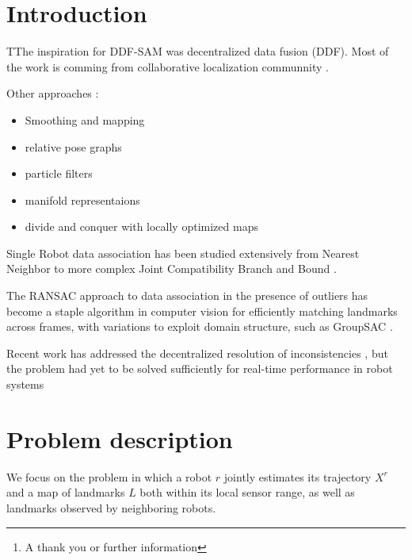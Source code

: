 \documentclass[twoside,twocolumn]{article}
\title{\citetitle{cunningham_fully_2012}} %
\author{%
\textsc{Virgile Daugé}\thanks{A thank you or further information} \\[1ex] %
\normalsize University of Lorraine \\ %
\normalsize \href{mailto:virgile.dauge@inria.fr}{virgile.dauge@inria.fr} %
}
\date{\today} %
\begin{document}
\maketitle


\section{Introduction}

\lettrine[nindent=0em,lines=3]{T}The inspiration for DDF-SAM \cite{cunningham_ddf-sam:_2010} was decentralized data
fusion (DDF). Most of the work is comming from collaborative localization communnity \cite{bailey_decentralised_2011,bahr_consistent_2009}.

Other approaches :
\begin{itemize}
  \item Smoothing and mapping \cite{andersson_c-sam:_2008}
  \item relative pose graphs \cite{kim_multiple_2010}
  \item particle filters \cite{howard_multi-robot_2006,carlone_rao-blackwellized_2010}
  \item manifold representaions \cite{howard_multirobot_2006}
  \item divide and conquer with locally optimized maps \cite{ni_multi-level_2010}
\end{itemize}

Single Robot data association has been studied extensively from
Nearest Neighbor \cite{} to more complex Joint Compatibility Branch
and Bound \cite{neira_data_2001}.

The RANSAC \cite{fischler_random_1981} approach to data association
in the presence of outliers has become a staple algorithm in
computer vision for efficiently matching landmarks across frames, with variations to exploit
domain  structure,  such  as  GroupSAC  \cite{ni_groupsac:_2009}.

Recent  work
has addressed the decentralized resolution of inconsistencies
\cite{aragues_consistent_2011},  but  the  problem  had  yet  to  be  solved  sufficiently  for
real-time performance in robot systems


\section{Problem description}
We  focus  on  the  problem  in  which  a  robot
$r$
jointly
estimates its trajectory
$X^r$
and a map of landmarks
$L$
both
within its local sensor range, as well as landmarks observed
by neighboring robots.
\end{document}
